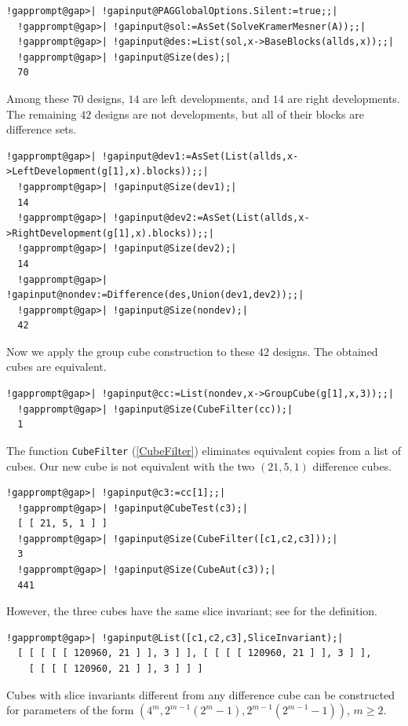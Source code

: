 \documentclass[a4paper,11pt]{report}
\begin{document}
{{\begin{Verbatim}[commandchars=!@|,fontsize=\small,frame=single,label=Example]
  !gapprompt@gap>| !gapinput@PAGGlobalOptions.Silent:=true;;|
  !gapprompt@gap>| !gapinput@sol:=AsSet(SolveKramerMesner(A));;|
  !gapprompt@gap>| !gapinput@des:=List(sol,x->BaseBlocks(allds,x));;|
  !gapprompt@gap>| !gapinput@Size(des);|
  70
\end{Verbatim}
 Among these $70$ designs, $14$ are left developments, and $14$ are right developments. The remaining $42$ designs are not developments, but all of their blocks are difference sets. 
\begin{Verbatim}[commandchars=!@|,fontsize=\small,frame=single,label=Example]
  !gapprompt@gap>| !gapinput@dev1:=AsSet(List(allds,x->LeftDevelopment(g[1],x).blocks));;|
  !gapprompt@gap>| !gapinput@Size(dev1);|
  14
  !gapprompt@gap>| !gapinput@dev2:=AsSet(List(allds,x->RightDevelopment(g[1],x).blocks));;|
  !gapprompt@gap>| !gapinput@Size(dev2);|
  14
  !gapprompt@gap>| !gapinput@nondev:=Difference(des,Union(dev1,dev2));;|
  !gapprompt@gap>| !gapinput@Size(nondev);|
  42
\end{Verbatim}
 Now we apply the group cube construction to these $42$ designs. The obtained cubes are equivalent. 
\begin{Verbatim}[commandchars=!@|,fontsize=\small,frame=single,label=Example]
  !gapprompt@gap>| !gapinput@cc:=List(nondev,x->GroupCube(g[1],x,3));;|
  !gapprompt@gap>| !gapinput@Size(CubeFilter(cc));|
  1
\end{Verbatim}
 The function \texttt{CubeFilter} (\ref{CubeFilter}) eliminates equivalent copies from a list of cubes. Our new cube is not
equivalent with the two $(21,5,1)$ difference cubes. 
\begin{Verbatim}[commandchars=!@|,fontsize=\small,frame=single,label=Example]
  !gapprompt@gap>| !gapinput@c3:=cc[1];;|
  !gapprompt@gap>| !gapinput@CubeTest(c3);|
  [ [ 21, 5, 1 ] ]
  !gapprompt@gap>| !gapinput@Size(CubeFilter([c1,c2,c3]));|
  3
  !gapprompt@gap>| !gapinput@Size(CubeAut(c3));|
  441
\end{Verbatim}
 However, the three cubes have the same slice invariant; see{\nobreakspace}\cite{KPT23} for the definition. 
\begin{Verbatim}[commandchars=!@|,fontsize=\small,frame=single,label=Example]
  !gapprompt@gap>| !gapinput@List([c1,c2,c3],SliceInvariant);|
  [ [ [ [ [ 120960, 21 ] ], 3 ] ], [ [ [ [ 120960, 21 ] ], 3 ] ], 
    [ [ [ [ 120960, 21 ] ], 3 ] ] ]
\end{Verbatim}
 Cubes with slice invariants different from any difference cube can be
constructed for parameters of the form $(4^m,2^{m-1}(2^m-1),2^{m-1}(2^{m-1}-1))$, $m\ge 2$. 
}}
\end{document}
